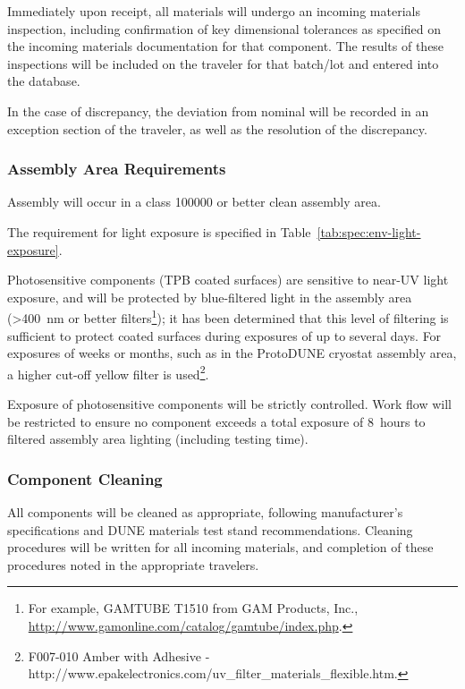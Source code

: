 Immediately upon receipt, all materials will undergo an incoming materials inspection, including confirmation of key dimensional tolerances as specified on the incoming materials documentation for that component.  The results of these inspections will be included on the traveler for that batch/lot and entered into the database.

In the case of discrepancy, the deviation from nominal will be recorded in an exception section of the traveler, as well as the resolution of the discrepancy.

\subsubsection{Assembly Area Requirements}

Assembly will occur in a class \num{100000} or better clean assembly area.  

The requirement for light exposure is specified in Table~\ref{tab:spec:env-light-exposure}.


Photosensitive components (TPB coated surfaces) are sensitive to near-UV light exposure, and will be protected by blue-filtered light in the assembly area (>\SI{400}{nm} or better filters\footnote{For example, GAMTUBE T1510 from GAM Products, Inc., \url{http://www.gamonline.com/catalog/gamtube/index.php}.}); it has been determined that this level of filtering is sufficient to protect coated surfaces during  exposures of up to several days. For exposures of weeks or months, such as in the ProtoDUNE cryostat assembly area, a higher cut-off yellow filter is used\footnote{F007-010 Amber with Adhesive - http://www.epakelectronics.com/uv\_filter\_materials\_flexible.htm.}. 



Exposure of photosensitive components will be strictly controlled.  Work flow will be restricted to ensure no component exceeds a total exposure of \SI{8}{hours} to filtered assembly area lighting (including testing time).

\subsubsection{Component Cleaning}

All components will be cleaned  as appropriate, following manufacturer's specifications and DUNE materials test stand recommendations.  Cleaning procedures will be written for all incoming materials, and completion of these procedures noted in the appropriate travelers.

